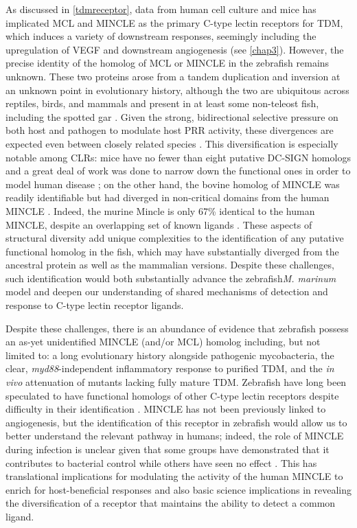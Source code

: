 As discussed in \autoref{tdmreceptor}, data from human cell culture and mice has implicated MCL and MINCLE as the primary C-type lectin receptors for TDM, which induces a variety of downstream responses, seemingly including the upregulation of VEGF and downstream angiogenesis (see \autoref{chap3}). However, the precise identity of the homolog of MCL or MINCLE in the zebrafish remains unknown. These two proteins arose from a tandem duplication and inversion at an unknown point in evolutionary history, although the two are ubiquitous across reptiles, birds, and mammals and present in at least some non-teleost fish, including the spotted gar \citep{Miyake2013, Richardson2014}. Given the strong, bidirectional selective pressure on both host and pathogen to modulate host PRR activity, these divergences are expected even between closely related species \citep{Rambaruth2015}. This diversification is especially notable among CLRs: mice have no fewer than eight putative DC-SIGN homologs and a great deal of work was done to narrow down the functional ones in order to model human disease \citep{GarciaVallejo2013}; on the other hand, the bovine homolog of MINCLE was readily identifiable but had diverged in non-critical domains from the human MINCLE \citep{Feinberg2013, Furukawa2013}. Indeed, the murine Mincle is only 67\% identical to the human MINCLE, despite an overlapping set of known ligands \citep{Matsumoto1999}. These aspects of structural diversity add unique complexities to the identification of any putative functional homolog in the fish, which may have substantially diverged from the ancestral protein as well as the mammalian versions. Despite these challenges, such identification would both substantially advance the zebrafish\textit{M. marinum} model and deepen our understanding of shared mechanisms of detection and response to C-type lectin receptor ligands.

Despite these challenges, there is an abundance of evidence that zebrafish possess an as-yet unidentified MINCLE (and/or MCL) homolog including, but not limited to: a long evolutionary history alongside pathogenic mycobacteria, the clear, \textit{myd88}-independent inflammatory response to purified TDM, and the \textit{in vivo} attenuation of mutants lacking fully mature TDM. Zebrafish have long been speculated to have functional homologs of other C-type lectin receptors despite difficulty in their identification \citep{Petit2019}. MINCLE has not been previously linked to angiogenesis, but the identification of this receptor in zebrafish would allow us to better understand the relevant pathway in humans; indeed, the role of MINCLE during infection is unclear given that some groups have demonstrated that it contributes to bacterial control while others have seen no effect \citep{Behler2012, Behler2015, Heitmann2013, Lee2012}. This has translational implications for modulating the activity of the human MINCLE to enrich for host-beneficial responses and also basic science implications in revealing the diversification of a receptor that maintains the ability to detect a common ligand. 

